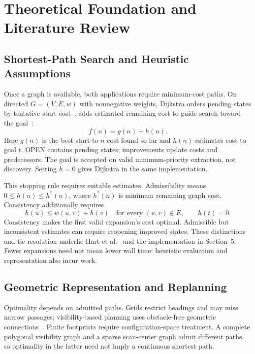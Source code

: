 \section{Theoretical Foundation and Literature Review}
\subsection{Shortest-Path Search and Heuristic Assumptions}
Once a graph is available, both applications require minimum-cost paths. On directed $G=(V,E,w)$ with nonnegative weights, Dijkstra orders pending states by tentative start cost~\cite{dijkstra1959}. \astar{} adds estimated remaining cost to guide search toward the goal~\cite{hart1968}:
\begin{equation}f(n)=g(n)+h(n).
\end{equation}
Here $g(n)$ is the best start-to-$n$ cost found so far and $h(n)$ estimates cost to goal $t$. OPEN contains pending states; improvements update costs and predecessors. The goal is accepted on valid minimum-priority extraction, not discovery. Setting $h=0$ gives Dijkstra in the same implementation.

This stopping rule requires suitable estimates. Admissibility means $0\leq h(n)\leq h^*(n)$, where $h^*(n)$ is minimum remaining graph cost. Consistency additionally requires
\begin{equation}
h(u)\leq w(u,v)+h(v)\quad\text{for every }(u,v)\in E,\qquad h(t)=0.
\label{eq:consistency}
\end{equation}
Consistency makes the first valid expansion's cost optimal. Admissible but inconsistent estimates can require reopening improved states. These distinctions and tie resolution underlie Hart et al.~\cite{hart1968} and the implementation in Section~5. Fewer expansions need not mean lower wall time: heuristic evaluation and representation also incur work.

\subsection{Geometric Representation and Replanning}
Optimality depends on admitted paths. Grids restrict headings and may miss narrow passages; visibility-based planning uses obstacle-free geometric connections~\cite{lozano1979}. Finite footprints require configuration-space treatment. A complete polygonal visibility graph and a sparse scan-center graph admit different paths, so optimality in the latter need not imply a continuous shortest path.

